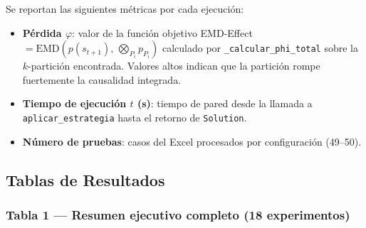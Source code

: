 Se reportan las siguientes métricas por cada ejecución:

\begin{itemize}
  \item \textbf{Pérdida $\varphi$}: valor de la función objetivo
        EMD-Effect $= \mathrm{EMD}(p(s_{t+1}),\, \bigotimes_{P_i} p_{P_i})$
        calculado por \texttt{\_calcular\_phi\_total} sobre la $k$-partición
        encontrada. Valores altos indican que la partición rompe fuertemente
        la causalidad integrada.

  \item \textbf{Tiempo de ejecución $t$ (s)}: tiempo de pared desde la
        llamada a \texttt{aplicar\_estrategia} hasta el retorno de
        \texttt{Solution}.

  \item \textbf{Número de pruebas}: casos del Excel procesados por
        configuración (49--50).
\end{itemize}

\subsection{Tablas de Resultados}

\subsubsection*{Tabla 1 — Resumen ejecutivo completo (18 experimentos)}

